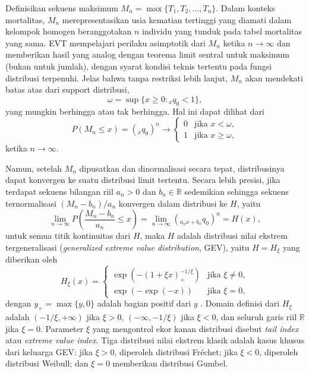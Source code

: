 Definisikan sekuens maksimum $M_n = \max\{T_1, T_2, \ldots, T_n\}$. Dalam konteks mortalitas, $M_n$ merepresentasikan usia kematian tertinggi yang diamati dalam kelompok homogen beranggotakan $n$ individu yang tunduk pada tabel mortalitas yang sama. EVT mempelajari perilaku asimptotik dari $M_n$ ketika $n \to \infty$ dan memberikan hasil yang analog dengan teorema limit sentral untuk maksimum (bukan untuk jumlah), dengan syarat kondisi teknis tertentu pada fungsi distribusi terpenuhi. Jelas bahwa tanpa restriksi lebih lanjut, $M_n$ akan mendekati batas atas dari support distribusi,
\begin{equation}
    \omega = \sup\{x \geq 0 : {}_xq_0 < 1\},
\end{equation}
yang mungkin berhingga atau tak berhingga. Hal ini dapat dilihat dari
\begin{equation}
    P(M_n \leq x) = ({}_xq_0)^n \to \begin{cases}
        0 & \text{jika } x < \omega, \\
        1 & \text{jika } x \geq \omega,
    \end{cases}
\end{equation}
ketika $n \to \infty$.

Namun, setelah $M_n$ dipusatkan dan dinormalisasi secara tepat, distribusinya dapat konvergen ke suatu distribusi limit tertentu. Secara lebih presisi, jika terdapat sekuens bilangan riil $a_n > 0$ dan $b_n \in \mathbb{R}$ sedemikian sehingga sekuens ternormalisasi $(M_n - b_n)/a_n$ konvergen dalam distribusi ke $H$, yaitu
\begin{equation}
    \lim_{n \to \infty} P\left(\frac{M_n - b_n}{a_n} \leq x\right) = \lim_{n \to \infty} \left({}_{{a_n x + b_n}}q_0\right)^n = H(x),
\end{equation}
untuk semua titik kontinuitas dari $H$, maka $H$ adalah distribusi nilai ekstrem tergeneralisasi (\textit{generalized extreme value distribution}, GEV), yaitu $H = H_\xi$ yang diberikan oleh
\begin{equation}
    H_\xi(x) = \begin{cases}
        \exp\left(-(1 + \xi x)_+^{-1/\xi}\right) & \text{jika } \xi \neq 0, \\
        \exp(-\exp(-x)) & \text{jika } \xi = 0,
    \end{cases}
\end{equation}
dengan $y_+ = \max\{y, 0\}$ adalah bagian positif dari $y$ \citep{coles2001introduction, resnick2007heavy}. Domain definisi dari $H_\xi$ adalah $(-1/\xi, +\infty)$ jika $\xi > 0$, $(-\infty, -1/\xi)$ jika $\xi < 0$, dan seluruh garis riil $\mathbb{R}$ jika $\xi = 0$. Parameter $\xi$ yang mengontrol ekor kanan distribusi disebut \textit{tail index} atau \textit{extreme value index}. Tiga distribusi nilai ekstrem klasik adalah kasus khusus dari keluarga GEV: jika $\xi > 0$, diperoleh distribusi Fr\'echet; jika $\xi < 0$, diperoleh distribusi Weibull; dan $\xi = 0$ memberikan distribusi Gumbel.

